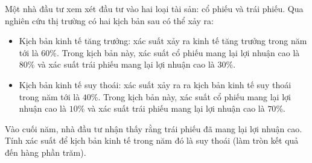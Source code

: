 \begin{bt}%
	Một nhà đầu tư xem xét  đầu tư vào hai loại tài sản: cổ phiếu và trái phiếu. Qua nghiên cứu thị trường có hai kịch bản sau có thể xảy ra:
	\begin{itemize}
		\item Kịch bản kinh tế tăng trưởng: xác suất xảy ra  kinh tế tăng trưởng trong năm tới là $60\%$. Trong kịch bản này, xác suất cổ phiếu mang lại lợi nhuận cao là $80\%$ và xác suất trái phiếu mang lại lợi nhuận cao là $30\%$.
		\item Kịch bản kinh tế suy thoái: xác suất xảy ra ra kịch bản kinh tế suy thoái trong năm tới là $40\%$. Trong kịch bản này, xác suất cổ  phiếu mang lại lợi nhuận cao là $10\%$ và xác suất trái phiếu mang lại lợi nhuận cao là $70\%$.
	\end{itemize} Vào cuối năm, nhà đầu tư nhận thấy rằng trái phiếu đã mang lại lợi nhuận cao. Tính xác suất để kịch bản kinh tế trong năm đó là suy thoái (làm tròn kết quả đến hàng phần trăm).
\end{bt}

